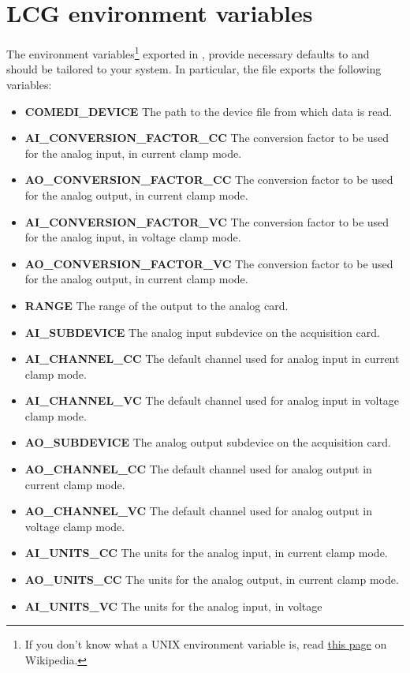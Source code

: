 \section{LCG environment variables}
\label{sec:envvar}
The environment variables\footnote{If you
  don't know what a UNIX environment variable is, read
  \href{http://en.wikipedia.org/wiki/Environment\_variable}{this page}
  on Wikipedia.} exported in
, provide necessary defaults
to \progname and should be tailored to your system. In particular, the
file exports the following variables:
\begin{itemize}
\item \textbf{COMEDI\_DEVICE} The path to the device file from which
  data is read.
\item \textbf{AI\_CONVERSION\_FACTOR\_CC} The conversion factor to be used for
  the analog input, in current clamp mode.
\item \textbf{AO\_CONVERSION\_FACTOR\_CC} The conversion factor to be used for
  the analog output, in current clamp mode.
\item \textbf{AI\_CONVERSION\_FACTOR\_VC} The conversion factor to be used for
  the analog input, in voltage clamp mode.
\item \textbf{AO\_CONVERSION\_FACTOR\_VC} The conversion factor to be used for
  the analog output, in current clamp mode.
\item \textbf{RANGE} The range of the output to the analog card.
\item \textbf{AI\_SUBDEVICE} The analog input subdevice on the
  acquisition card.
\item \textbf{AI\_CHANNEL\_CC} The default channel used for analog
  input in current clamp mode.
\item \textbf{AI\_CHANNEL\_VC} The default channel used for analog
  input in voltage clamp mode.
\item \textbf{AO\_SUBDEVICE} The analog output subdevice on the
  acquisition card.
\item \textbf{AO\_CHANNEL\_CC} The default channel used for analog
  output in current clamp mode.
\item \textbf{AO\_CHANNEL\_VC} The default channel used for analog
  output in voltage clamp mode.
\item \textbf{AI\_UNITS\_CC} The units for the analog input, in current
  clamp mode.
\item \textbf{AO\_UNITS\_CC} The units for the analog output, in current
  clamp mode.
\item \textbf{AI\_UNITS\_VC} The units for the analog input, in voltage

\end{itemize}

